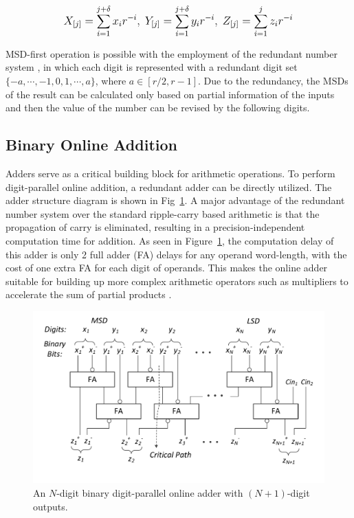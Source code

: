 \documentclass[conference]{IEEEtran}
\begin{document}
\begin{eqnarray}\label{Eq:Online_Operands}
\footnotesize
  X_{[j]}=\sum_{i=1}^{j+\delta}x_ir^{-i},~Y_{[j]}=\sum_{i=1}^{j+\delta}y_ir^{-i},~Z_{[j]}=\sum_{i=1}^{j}z_ir^{-i}
\normalsize
\end{eqnarray}

MSD-first operation is possible with the employment of the redundant number system \cite{RedundantNumber}, in which each digit is represented with a redundant digit set $\{-a, \cdots,-1,0, 1, \cdots, a\}$, where $a\in[r/2,r-1]$. Due to the redundancy, the MSDs of the result can be calculated only based on partial information of the inputs and then the value of the number can be revised by the following digits.

\subsection{Binary Online Addition}
Adders serve as a critical building block for arithmetic operations. To perform digit-parallel online addition, a redundant adder can be directly utilized. The adder structure diagram is shown in Fig~\ref{Fig:Radix2SD_adder}. A major advantage of the redundant number system over the standard ripple-carry based arithmetic is that the propagation of carry is eliminated, resulting in a precision-independent computation time for addition. As seen in Figure~\ref{Fig:Radix2SD_adder}, the computation delay of this adder is only 2 full adder (FA) delays for any operand word-length, with the cost of one extra FA for each digit of operands. This makes the online adder suitable for building up more complex arithmetic operators such as multipliers to accelerate the sum of partial products \cite{RedundantMult_1987}.

\begin{figure}[htbp]
	\centering
	\includegraphics[width=.5\textwidth]{./Figures/SDAdder.pdf}
	\caption{An $N$-digit binary digit-parallel online adder with $(N+1)$-digit outputs.}
	\label{Fig:Radix2SD_adder}
\end{figure}
\end{document}
